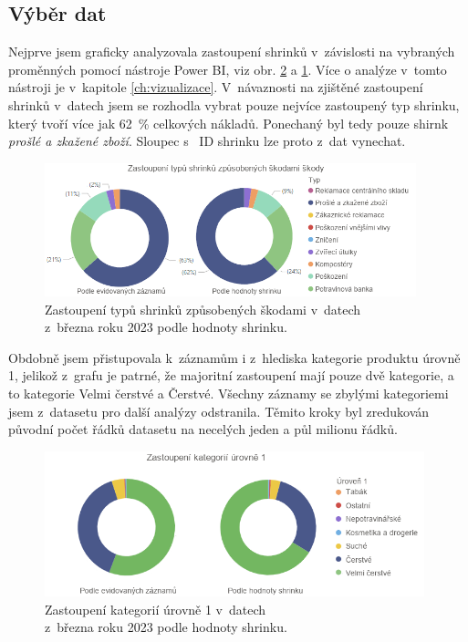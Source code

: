 

\subsection{Výběr dat}

Nejprve jsem graficky analyzovala zastoupení shrinků v~závislosti na vybraných proměnných pomocí nástroje Power BI, viz obr. \ref*{obr:rok:g:zastoupeni1} a \ref*{obr:rok:g:zastoupenish1}. Více o analýze v~tomto nástroji je v~kapitole \ref{ch:vizualizace}. V~návaznosti na zjištěné zastoupení shrinků v~datech jsem se rozhodla vybrat pouze nejvíce zastoupený typ shrinku, který tvoří více jak 62~\% celkových nákladů. Ponechaný byl tedy pouze shirnk \emph{prošlé a zkažené zboží}. Sloupec s~ ID shrinku lze proto z~dat vynechat.

\begin{figure}[h!]
    \centering
    \captionsetup{justification=centering}
    \includegraphics[width=0.96\textwidth]{obrazky/grafy/zastoupenishrinky.png}
    \caption{Zastoupení typů shrinků způsobených škodami v~datech \\ z~března roku 2023 podle hodnoty shrinku.}
    \label{obr:rok:g:zastoupenish1}
\end{figure}

Obdobně jsem přistupovala k~záznamům i z~hlediska kategorie produktu úrovně 1, jelikož z~grafu je patrné, že majoritní zastoupení mají pouze dvě kategorie, a to kategorie Velmi čerstvé a Čerstvé. Všechny záznamy se zbylými kategoriemi jsem z~datasetu pro další analýzy odstranila. Těmito kroky byl zredukován původní počet řádků datasetu na %
necelých jeden a půl milionu řádků.

\begin{figure}[h!]
    \centering
    \captionsetup{justification=centering}
    \includegraphics[width=0.98\textwidth]{obrazky/grafy/zastoupeniL1.png}
    \caption{Zastoupení kategorií úrovně 1 v~datech \\ z~března roku 2023 podle hodnoty shrinku.}
    \label{obr:rok:g:zastoupeni1}
\end{figure}

